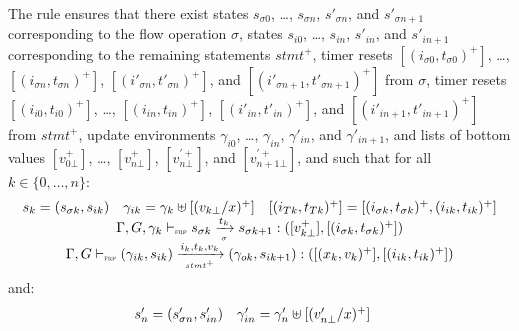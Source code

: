 \begin{skippableproof}
\begin{itemize}
              The rule  ensures that
              there exist
              states $s_{\sigma 0}$, \dots, $s_{\sigma n}$, $s'_{\sigma n}$, and $s'_{\sigma n+1}$ corresponding to the flow operation $\sigma$,
              states $s_{i0}$, \dots, $s_{in}$, $s'_{in}$, and $s'_{in+1}$ corresponding to the remaining statements $stmt^+$,
              timer resets $[(i_{\sigma 0}, t_{\sigma 0})^+]$, \dots, $[(i_{\sigma n}, t_{\sigma n})^+]$, $[(i'_{\sigma n}, t'_{\sigma n})^+]$, and $[(i'_{\sigma n+1}, t'_{\sigma n+1})^+]$ from $\sigma$,
              timer resets $[(i_{i0}, t_{i0})^+]$, \dots, $[(i_{in}, t_{in})^+]$, $[(i'_{in}, t'_{in})^+]$, and $[(i'_{in+1}, t'_{in+1})^+]$ from $stmt^+$,
              update environments $\gamma_{i0}$, \dots, $\gamma_{in}$, $\gamma'_{in}$, and $\gamma'_{in+1}$, and
              lists of bottom values $[v_{0\bot}^+]$, \dots, $[v_{n\bot}^+]$, $[v_{n\bot}^{\prime+}]$, and $[v_{n+1\bot}^{\prime+}]$, and
              such that for all $k \in \{0, \dots, n\}$:
              \begin{equation*}
                  \begin{array}{c}
                      s_k = (s_{\sigma k}, s_{ik})                                                                                                                \quad
                      \gamma_{ik} = \gamma_k \uplus [(v_{k\bot}/x)^+]                                                                                         \quad
                      { [(i_{Tk}, t_{Tk})^+] = [(i_{\sigma k}, t_{\sigma k})^+, (i_{ik}, t_{ik})^+] }                                  \\
                      \Gamma, G, \gamma_k \vdash_{\textnormal{\tiny\textsc{frp}}} s_{\sigma k} \xrightarrow[\mbox{\tiny\ensuremath{\sigma}}]{t_k} s_{\sigma  k+1}: ([v_{k\bot}^+], [(i_{\sigma k}, t_{\sigma k})^+])   \\
                      \Gamma, G \vdash_{\textnormal{\tiny\textsc{frp}}} (\gamma_{ik}, s_{ik}) \xrightarrow[\mbox{\tiny\ensuremath{stmt^+}}]{i_k, t_k, v_k} (\gamma_{ok}, s_{i k+1}): ([(x_k, v_k)^+], [(i_{ik}, t_{ik})^+]) \\
                  \end{array}
              \end{equation*}
              and:
              \begin{equation*}
                  \begin{array}{c}
                      s'_n = (s'_{\sigma n}, s'_{in})                                                                                                             \quad
                      \gamma'_{in} = \gamma'_n \uplus [(v'_{n\bot}/x)^+]                                                                                      \quad

\end{array}
\end{equation*}
\end{itemize}
\end{skippableproof}

